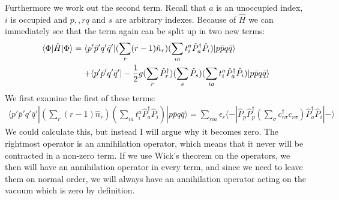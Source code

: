 \documentclass[norsk,a4paper,12pt]{article}
\begin{document}
Furthermore we work out the second term. Recall that $a$ is an unoccupied index, $i$ is occupied and $p, , rq$ and $s$ are arbitrary indexes. Because of $\hat{H}$ we can immediately see that the term again can be split up in two new terms:
\begin{align}
\langle\Phi|\hat{H}|\Phi\rangle&=\langle p'\bar{p}'q'\bar{q}'|(\sum_r(r-1)\hat{n}_r)(\sum_{ia}t_i^a\hat{P}_a^{\dagger}\hat{P}_i)|p\bar{p}q\bar{q}\rangle\notag\\
&\mathrel{\phantom{=}}+\langle p'\bar{p}'q'\bar{q}'|-\frac{1}{2}g(\sum_{r}\hat{P}_r^{\dagger})(\sum_s\hat{P}_s)(\sum_{ia}t_i^a\hat{P}_a^{\dagger}\hat{P}_i)|p\bar{p}q\bar{q}\rangle
\end{align}
We first examine the first of these terms:
\begin{align*}
\langle p'\bar{p}'q'\bar{q}'|(\sum_r(r-1)\hat{n}_r)(\sum_{ia}t_i^a\hat{P}_a^{\dagger}\hat{P}_i)|p\bar{p}q\bar{q}\rangle=\sum_{ria}\epsilon_r\langle-|\hat{P}_{p}\hat{P}_p^{\dagger}(\sum_{\sigma}c_{r\sigma}^{\dagger}c_{r\sigma})\hat{P}_a^{\dagger}\hat{P}_i|-\rangle
\end{align*}
We could calculate this, but instead I will argue why it becomes zero. The rightmost operator is an annihilation operator, which means that it never will be contracted in a non-zero term. If we use Wick's theorem on the operators, we then will have an annihilation operator in every term, and since we need to leave them on normal order, we will always have an annihilation operator acting on the vacuum which is zero by definition. 
\end{document}

